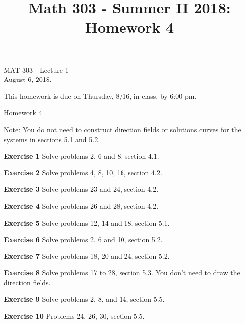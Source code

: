 \documentclass[12pt,oneside]{exam}
\title{Math 303 - Summer II 2018: Homework 4}
\newenvironment{exercise}[1]{\vspace{.1in}\noindent\textbf{Exercise #1 \hspace{.05em}}}{}
\begin{document}
\begin{flushright}
\sc MAT 303 - Lecture 1\\
August 6, 2018.
\end{flushright}
\bigskip

This homework is due on Thursday, 8/16, in class, by 6:00 pm. 
\begin{center}
\textsf{Homework 4} 
\end{center}


Note: You do not need to construct direction fields or solutions curves for the systems in sections 5.1 and 5.2.  

\begin{exercise}{1}
Solve problems 2, 6 and 8, section 4.1. 
\end{exercise}

\begin{exercise}{2}
Solve problems 4, 8, 10, 16, section 4.2.  
\end{exercise}

\begin{exercise}{3}
Solve problems 23 and 24, section 4.2.  
\end{exercise}

\begin{exercise}{4} 
Solve problems 26 and 28, section 4.2. 
\end{exercise}

\begin{exercise}{5}
Solve problems 12, 14 and 18, section 5.1. 
\end{exercise}

\begin{exercise}{6} 
Solve problems 2, 6 and 10, section 5.2. 
\end{exercise}

\begin{exercise}{7}
Solve problems 18, 20 and 24, section 5.2. 
\end{exercise}

\begin{exercise}{8}
Solve problems 17 to 28, section 5.3. You don't need to draw the direction fields. 
\end{exercise}

\begin{exercise}{9}
Solve problems 2, 8, and 14, section 5.5. 
\end{exercise}

\begin{exercise}{10} 
Problems 24, 26, 30, section 5.5.
\end{exercise}
\end{document}

